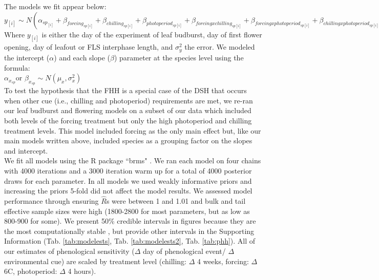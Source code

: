 \documentclass[12pt]{article}\usepackage[]{graphicx}\usepackage[]{color}
\begin{document}
The models we fit appear below:\\

$y_{[i]} \sim N(\alpha_{sp_{[i]}}+\beta_{forcing_{sp[i]}}+\beta_{chilling_{sp[i]}}+\beta_{photoperiod_{sp[i]}}+\beta_{forcing x chilling_{sp[i]}}+\beta_{forcing x photoperiod_{sp[i]}}+\beta_{chilling x photoperiod_{sp[i]}}, \sigma_y^2)$\\

Where $y_{[i]}$ is either the day of the experiment of leaf budburst, day of first flower opening, day of leafout or FLS interphase length, and $\sigma_y^2$ the error.  We modeled the intercept ($\alpha$) and each slope ($\beta$) parameter at the species level using the formula:\\

$\alpha_{x_{sp}} $or $\beta_{x_{sp}} \sim N(\mu_x,\sigma^2_x)$\\

\noindent To test the hypothesis that the FHH is a special case of the DSH that occurs when other cue (i.e., chilling and photoperiod) requirements are met, we re-ran our leaf budburst and flowering models on a subset of our data which included both levels of the forcing treatment but only the high photoperiod and chilling treatment levels. This model included forcing as the only main effect but, like our main models written above, included species as a grouping factor on the slopes and intercept.\\ 

\noindent We fit all models using the R package ``brms" \citep{Burkner2018}. We ran each model on four chains with 4000 iterations and a 3000 iteration warm up for a total of 4000 posterior draws for each parameter. In all models we used weakly informative priors and increasing the priors 5-fold did not affect the model results. We assessed  model performance through ensuring $\hat{R}$s were between 1 and 1.01 and bulk and tail effective sample sizes were high (1800-2800 for most parameters, but as low as  800-900 for some). We present 50\% credible intervals in figures because they are the most computationally stable \citep{Gelman2013}, but provide other intervals in the Supporting Information (Tab. \ref{tab:modelests}, Tab. \ref{tab:modelests2}, Tab. \ref{tab:phh}). All of our estimates of phenological sensitivity ($\Delta$ day of phenological event/ $\Delta$ environmental cue) are scaled by treatment level (chilling: $\Delta$ 4 weeks, forcing: $\Delta$ 6\degree C, photoperiod: $\Delta$ 4 hours).\\
\end{document}
